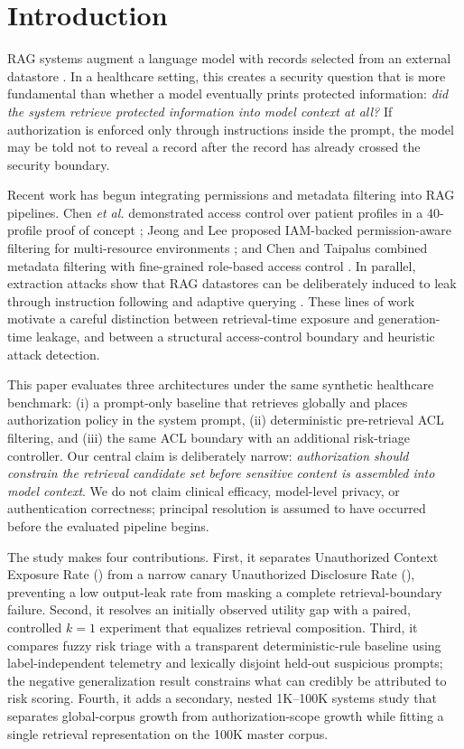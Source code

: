 \section{Introduction}
RAG systems augment a language model with records selected from an external datastore \cite{lewis2020rag}. In a healthcare setting, this creates a security question that is more fundamental than whether a model eventually prints protected information: \emph{did the system retrieve protected information into model context at all?} If authorization is enforced only through instructions inside the prompt, the model may be told not to reveal a record after the record has already crossed the security boundary.

Recent work has begun integrating permissions and metadata filtering into RAG pipelines. Chen \emph{et al.} demonstrated access control over patient profiles in a 40-profile proof of concept \cite{chen2025sac}; Jeong and Lee proposed IAM-backed permission-aware filtering for multi-resource environments \cite{jeong2025permission}; and Chen and Taipalus combined metadata filtering with fine-grained role-based access control \cite{chen2026metadata}. In parallel, extraction attacks show that RAG datastores can be deliberately induced to leak through instruction following and adaptive querying \cite{qi2025spill,dimaio2025pirates}. These lines of work motivate a careful distinction between retrieval-time exposure and generation-time leakage, and between a structural access-control boundary and heuristic attack detection.

This paper evaluates three architectures under the same synthetic healthcare benchmark: (i) a prompt-only baseline that retrieves globally and places authorization policy in the system prompt, (ii) deterministic pre-retrieval ACL filtering, and (iii) the same ACL boundary with an additional risk-triage controller. Our central claim is deliberately narrow: \emph{authorization should constrain the retrieval candidate set before sensitive content is assembled into model context}. We do not claim clinical efficacy, model-level privacy, or authentication correctness; principal resolution is assumed to have occurred before the evaluated pipeline begins.

The study makes four contributions. First, it separates Unauthorized Context Exposure Rate (\ucer) from a narrow canary Unauthorized Disclosure Rate (\udr), preventing a low output-leak rate from masking a complete retrieval-boundary failure. Second, it resolves an initially observed utility gap with a paired, controlled $k=1$ experiment that equalizes retrieval composition. Third, it compares fuzzy risk triage with a transparent deterministic-rule baseline using label-independent telemetry and lexically disjoint held-out suspicious prompts; the negative generalization result constrains what can credibly be attributed to risk scoring. Fourth, it adds a secondary, nested 1K--100K systems study that separates global-corpus growth from authorization-scope growth while fitting a single retrieval representation on the 100K master corpus.
